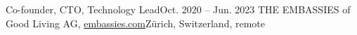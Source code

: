 \resumeSubheading
{Co-founder, CTO, Technology Lead}{Oct. 2020 -- Jun. 2023}
{THE EMBASSIES of Good Living AG, \href{https://embassies.com}{embassies.com}}{Zürich, Switzerland, remote}
\resumeItemListStart
\resumeItemListEnd